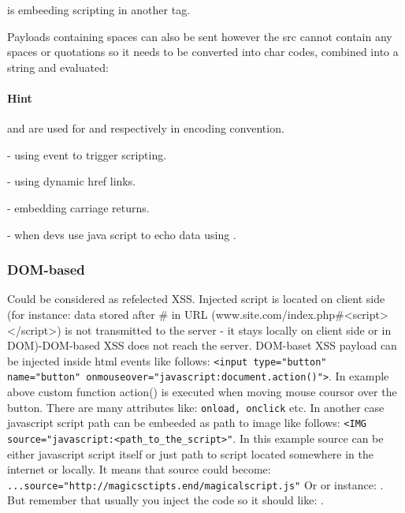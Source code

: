  is embeeding scripting in another tag.


Payloads containing spaces can also be sent however the src cannot contain any spaces or quotations so it needs to be converted into char codes, combined into a string and evaluated: \newline
{} \newline

\paragraph{Hint}  and  are used for \q{<} and \q{>} respectively in encoding convention.\newline

 - using event to trigger scripting.\newline

 - using dynamic href links.\newline

 - embedding carriage returns.\newline

 - when devs use java script to echo data using .\newline


\subsubsection{DOM-based} Could be considered as refelected XSS. Injected script is located on client side (for instance: data stored after \# in URL (www.site.com/index.php\#<script></script>) is not transmitted to the server - it stays locally on client side or in DOM)-DOM-based XSS does not reach the server.
DOM-baset XSS payload can be injected inside html events like follows: \texttt{<input type="button" name="button" onmouseover="javascript:document.action()">}.
In example above custom function action() is executed when moving mouse coursor over the button.
There are many attributes like: \texttt{onload, onclick} etc.
In another case javascript script path can be embeeded as path to image like follows:
\texttt{<IMG source="javascript:<path\_to\_the\_script>"}.
In this example source can be either javascript script itself or just path to script located somewhere in the internet or locally.
It means that source could become:
\texttt{...source="http://magicsctipts.end/magicalscript.js"}
Or or instance: .
But remember that usually you inject the code so it should like: .

